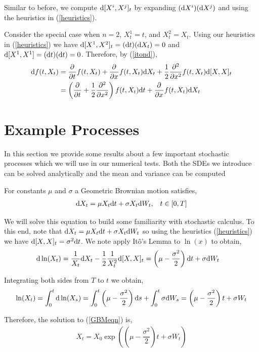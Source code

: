 \documentclass[12pt]{article}
\begin{document}
Similar to before, we compute \( \d[X^i,X^j]_t \) by expanding \( (\d X^i)(\d X^j) \) and using the heuristics in (\ref{heuristics}).

Consider the special case when \( n=2 \), \( X_t^1 = t\), and \( X_t^2 = X_t \). Using our heuristics in (\ref{heuristics}) we have \( \d[X^1,X^2]_t = (\d t)(\d X_t) = 0 \) and \( \d[X^1,X^1] = (\d t)(\d t) = 0 \). Therefore, by (\ref{itond}),
\begin{align}
    \d f(t,X_t) &= \pp{}{t} f(t,X_t) + \pp{}{x} f(t,X_t) \d X_t + \dfrac{1}{2} \pp[2]{}{x}f(t,X_t) \d [X,X]_t
    \\ &= \left( \pp{}{t} + \dfrac{1}{2}\pp[2]{}{x} \right)f(t,X_t)\d t + \pp{}{x} f(t,X_t) \d X_t \label{2dito}
\end{align}


\section{Example Processes}
In this section we provide some results about a few important stochastic processes which we will use in our numerical tests. Both the SDEs we introduce can be solved analytically and the mean and variance can be computed

For constants \( \mu \) and \( \sigma \) a Geometric Brownian motion satisfies,
\begin{align}
    \d X_t = \mu X_t \d t + \sigma X_t \d W_t, && t\in[0,T] \label{GBMeqn}
\end{align}

We will solve this equation to build some familiarity with stochastic calculus.
To this end, note that \( \d X_t = \mu X_t \d t + \sigma X_t \d W_t \) so using the heuristics (\ref{heuristics}) we have \( \d[X,X]_t = \sigma^2 \d t \). We note apply It\^o's Lemma to \( \ln(x) \) to obtain,
\begin{align*}
    \d \ln (X_t) &= \dfrac{1}{X_t} \d X_t - \dfrac{1}{2} \dfrac{1}{X_t^2} \d[X,X]_t
    = \left( \mu - \dfrac{\sigma^2}{2} \right) \d t + \sigma \d W_t
\end{align*}

Integrating both sides from \( T \) to \( t \) we obtain,
\begin{align*}
    \ln (X_t) = \int_0^t \d \ln(X_s) = \int_0^t \left( \mu - \dfrac{\sigma^2}{2} \right)\d s + \int_0^t \sigma \d W_s = \left( \mu - \dfrac{\sigma^2}{2} \right) t + \sigma W_t
\end{align*}

Therefore, the solution to (\ref{GBMeqn}) is,
\begin{align*}
    X_t = X_0 \exp\left( \left( \mu - \dfrac{\sigma^2}{2} \right)t + \sigma W_t \right)
\end{align*}
\end{document}
